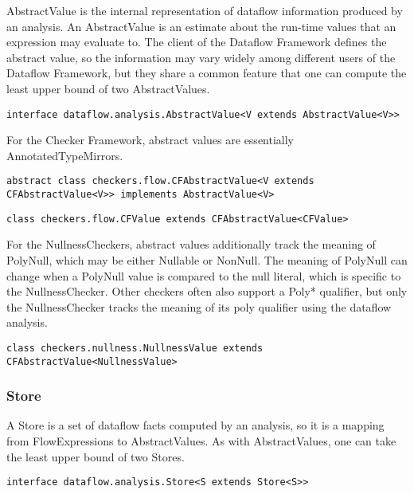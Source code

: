     AbstractValue is the internal representation of dataflow information
    produced by an analysis.  An AbstractValue is an estimate about the
    run-time values that an expression may evaluate to.  The client of the
    Dataflow Framework defines the abstract value, so the information may
    vary widely among different users of the Dataflow Framework, but they
    share a common feature that one can compute the least upper bound of
    two AbstractValues.

        \begin{verbatim}interface dataflow.analysis.AbstractValue<V extends AbstractValue<V>>\end{verbatim}
        
    For the Checker Framework, abstract values are essentially AnnotatedTypeMirrors.
        
        \begin{verbatim}abstract class checkers.flow.CFAbstractValue<V extends CFAbstractValue<V>> implements AbstractValue<V>\end{verbatim}
        
        \begin{verbatim}class checkers.flow.CFValue extends CFAbstractValue<CFValue>\end{verbatim}
        
    For the NullnessCheckers, abstract values additionally track the meaning of PolyNull, which may be either Nullable or NonNull.  The meaning of PolyNull can change when a PolyNull value is compared to the null literal, which is specific to the NullnessChecker.  Other checkers often also support a Poly* qualifier, but only the NullnessChecker tracks the meaning of its poly qualifier using the dataflow analysis.
        
        \begin{verbatim}class checkers.nullness.NullnessValue extends CFAbstractValue<NullnessValue>\end{verbatim}


\subsubsection{Store}
\label{sec:store_classes}

    A Store is a set of dataflow facts computed by an analysis, so it is a mapping from FlowExpressions to AbstractValues.  As with AbstractValues, one can take the least upper bound of two Stores.

    \begin{verbatim}interface dataflow.analysis.Store<S extends Store<S>>\end{verbatim}

